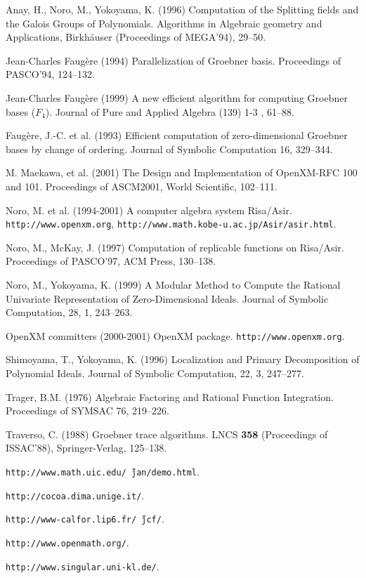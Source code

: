 \documentclass[runningheads]{cl2emult}
\begin{document}
\begin{thebibliography}{7}
%

Anay, H., Noro, M., Yokoyama, K. (1996)
Computation of the Splitting fields and the Galois Groups of Polynomials.
Algorithms in Algebraic geometry and Applications, 
Birkh\"auser (Proceedings of MEGA'94), 29--50.

Jean-Charles Faug\`ere (1994)
Parallelization of Groebner basis.
Proceedings of PASCO'94, 124--132.

Jean-Charles Faug\`ere (1999)
A new efficient algorithm for computing Groebner bases  ($F_4$).
Journal of Pure and Applied Algebra (139) 1-3 , 61--88.

Faug\`ere, J.-C. et al. (1993)
Efficient computation of zero-dimensional Groebner bases by change of ordering.
Journal of Symbolic Computation 16, 329--344.

M. Maekawa, et al. (2001)
The Design and Implementation of OpenXM-RFC 100 and 101.
Proceedings of ASCM2001, World Scientific, 102--111.

Noro, M. et al. (1994-2001)
A computer algebra system Risa/Asir.
{\tt http://www.openxm.org}, {\tt http://www.math.kobe-u.ac.jp/Asir/asir.html}.

Noro, M., McKay, J. (1997)
Computation of replicable functions on Risa/Asir.
Proceedings of PASCO'97, ACM Press, 130--138.

Noro, M., Yokoyama, K. (1999)
A Modular Method to Compute the Rational Univariate
Representation of Zero-Dimensional Ideals.
Journal of Symbolic Computation, 28, 1, 243--263.

OpenXM committers (2000-2001)
OpenXM package.
{\tt http://www.openxm.org}.

Shimoyama, T., Yokoyama, K. (1996)
Localization and Primary Decomposition of Polynomial Ideals.
Journal of Symbolic Computation, 22, 3, 247--277.

Trager, B.M. (1976)
Algebraic Factoring and Rational Function Integration.
Proceedings of SYMSAC 76, 219--226.

Traverso, C. (1988)
Groebner trace algorithms.
LNCS {\bf 358} (Proceedings of ISSAC'88), Springer-Verlag, 125--138.

{\tt http://www.math.uic.edu/\~\,jan/demo.html}.

{\tt http://cocoa.dima.unige.it/}.

{\tt http://www-calfor.lip6.fr/\~\,jcf/}.


{\tt http://www.openmath.org/}.

{\tt http://www.singular.uni-kl.de/}.

\end{thebibliography}

\clearpage
{}
\flushbottom
\printindex
\end{document}
